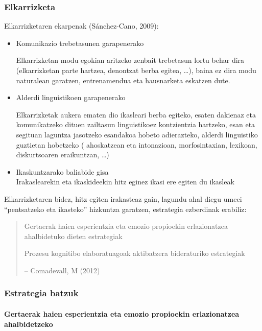 \documentclass[
]{book}
\begin{document}
\hypertarget{elkarrizketa}{%
\subsubsection{Elkarrizketa}\label{elkarrizketa}}

Elkarrizketaren ekarpenak (Sánchez-Cano, 2009):

\begin{itemize}
\item
  Komunikazio trebetasunen garapenerako

  Elkarrizketan modu egokian aritzeko zenbait trebetasun lortu behar dira (elkarrizketan parte hartzea, denontzat berba egitea, \ldots), baina ez dira modu naturalean garatzen, entrenamendua eta hausnarketa eskatzen dute.
\item
  Alderdi linguistikoen garapenerako

  Elkarrizketak aukera ematen dio ikasleari berba egiteko, esaten dakienaz eta komunikatzeko dituen zailtasun linguistikoez kontzientzia hartzeko, esan eta segituan laguntza jasotzeko esandakoa hobeto adierazteko, alderdi linguistiko guztietan hobetzeko ( ahoskatzean eta intonazioan, morfosintaxian, lexikoan, diskurtsoaren eraikuntzan, \ldots)
\item
  Ikaskuntzarako baliabide gisa\\
  Irakaslearekin eta ikaskideekin hitz eginez ikasi ere egiten du ikasleak
\end{itemize}

Elkarrizketaren bidez, hitz egiten irakasteaz gain, lagundu ahal diegu umeei ``pentsatzeko eta ikasteko'' hizkuntza garatzen, estrategia ezberdinak erabiliz:

\begin{quote}
Gertaerak haien esperientzia eta emozio propioekin erlazionatzea ahalbidetuko dieten estrategiak

Prozesu kognitibo elaboratuagoak aktibatzera bideraturiko estrategiak

-- Comadevall, M (2012)
\end{quote}

\hypertarget{estrategia-batzuk}{%
\subsubsection{Estrategia batzuk}\label{estrategia-batzuk}}

\hypertarget{gertaerak-haien-esperientzia-eta-emozio-propioekin-erlazionatzea-ahalbidetzeko}{%
\paragraph{Gertaerak haien esperientzia eta emozio propioekin erlazionatzea ahalbidetzeko}\label{gertaerak-haien-esperientzia-eta-emozio-propioekin-erlazionatzea-ahalbidetzeko}}
\end{document}
